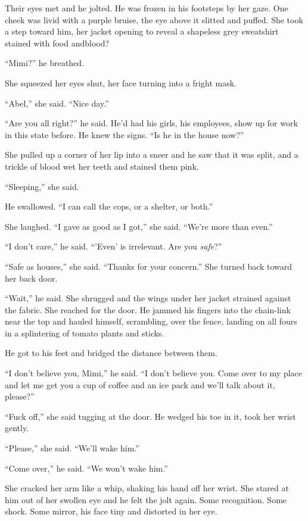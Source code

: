 Their eyes met and he jolted.  He was frozen in his footsteps by her
gaze.  One cheek was livid with a purple bruise, the eye above it
slitted and puffed.  She took a step toward him, her jacket opening to
reveal a shapeless grey sweatshirt stained with food and\dash{}blood?

``Mimi?'' he breathed.

She squeezed her eyes shut, her face turning into a fright mask.

``Abel,'' she said.  ``Nice day.''

``Are you all right?'' he said.  He'd had his girls, his employees,
show up for work in this state before.  He knew the signs.  ``Is he in
the house now?''

She pulled up a corner of her lip into a sneer and he saw that it was
split, and a trickle of blood wet her teeth and stained them pink.

``Sleeping,'' she said.

He swallowed.  ``I can call the cops, or a shelter, or both.''

She laughed.  ``I gave as good as I got,'' she said.  ``We're more
than even.''

``I don't care,'' he said.  ``'Even' is irrelevant.  Are you
\textit{safe}?''

``Safe as houses,'' she said.  ``Thanks for your concern.'' She turned
back toward her back door.

``Wait,'' he said.  She shrugged and the wings under her jacket
strained against the fabric.  She reached for the door.  He jammed his
fingers into the chain-link near the top and hauled himself,
scrambling, over the fence, landing on all fours in a splintering of
tomato plants and sticks.

He got to his feet and bridged the distance between them.

``I don't believe you, Mimi,'' he said.  ``I don't believe you.  Come
over to my place and let me get you a cup of coffee and an ice pack
and we'll talk about it, please?''

``Fuck off,'' she said tugging at the door.  He wedged his toe in it,
took her wrist gently.

``Please,'' she said.  ``We'll wake him.''

``Come over,'' he said.  ``We won't wake him.''

She cracked her arm like a whip, shaking his hand off her wrist.  She
stared at him out of her swollen eye and he felt the jolt again.  Some
recognition.  Some shock.  Some mirror, his face tiny and distorted in
her eye.

